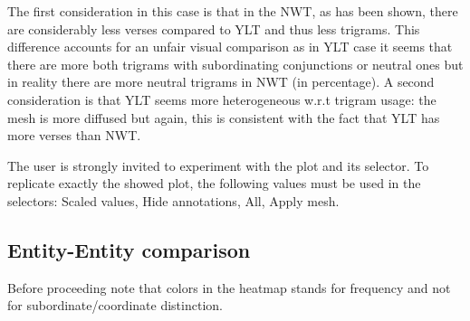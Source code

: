 \documentclass[sigchi]{article}
\begin{document}
The first consideration in this case is that in the NWT, as has been shown, there are considerably less verses compared to YLT and thus less trigrams. This difference accounts for an unfair visual comparison as in YLT case it seems that there are more both trigrams with subordinating conjunctions or neutral ones but in reality there are more neutral trigrams in NWT (in percentage). A second consideration is that YLT seems more heterogeneous w.r.t trigram usage: the mesh is more diffused but again, this is consistent with the fact that YLT has more verses than NWT. 

The user is strongly invited to experiment with the plot and its selector. To replicate exactly the showed plot, the following values must be used in the selectors: Scaled values, Hide annotations, All, Apply mesh.

\subsection{Entity-Entity comparison}
Before proceeding note that colors in the heatmap stands for frequency and not for subordinate/coordinate distinction. \\ \\
\end{document}
